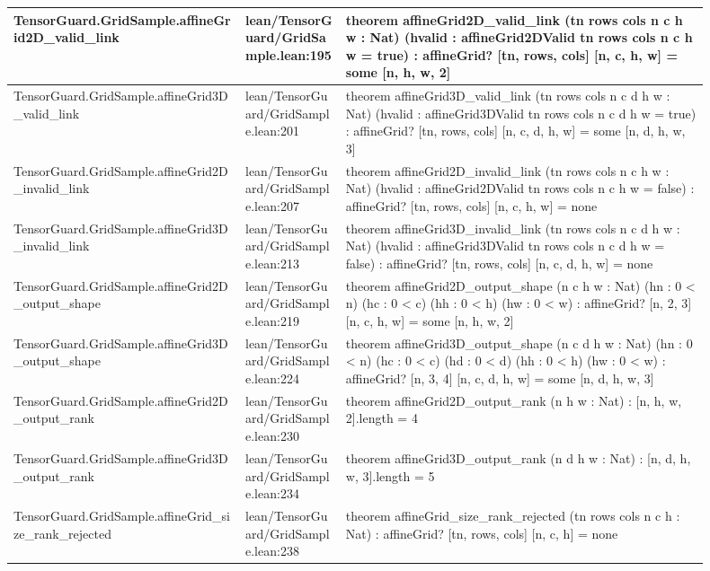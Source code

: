 \documentclass[10pt]{article}
\begin{document}
\begin{longtable}{|p{0.30\linewidth}|p{0.13\linewidth}|p{0.47\linewidth}|}
\hline
TensorGuard.GridSample.affineGrid2D\_valid\_link & lean/TensorGuard/GridSample.lean:195 & theorem affineGrid2D\_valid\_link (tn rows cols n c h w : Nat) (hvalid : affineGrid2DValid tn rows cols n c h w = true) : affineGrid? [tn, rows, cols] [n, c, h, w] = some [n, h, w, 2] \\
\hline
TensorGuard.GridSample.affineGrid3D\_valid\_link & lean/TensorGuard/GridSample.lean:201 & theorem affineGrid3D\_valid\_link (tn rows cols n c d h w : Nat) (hvalid : affineGrid3DValid tn rows cols n c d h w = true) : affineGrid? [tn, rows, cols] [n, c, d, h, w] = some [n, d, h, w, 3] \\
\hline
TensorGuard.GridSample.affineGrid2D\_invalid\_link & lean/TensorGuard/GridSample.lean:207 & theorem affineGrid2D\_invalid\_link (tn rows cols n c h w : Nat) (hvalid : affineGrid2DValid tn rows cols n c h w = false) : affineGrid? [tn, rows, cols] [n, c, h, w] = none \\
\hline
TensorGuard.GridSample.affineGrid3D\_invalid\_link & lean/TensorGuard/GridSample.lean:213 & theorem affineGrid3D\_invalid\_link (tn rows cols n c d h w : Nat) (hvalid : affineGrid3DValid tn rows cols n c d h w = false) : affineGrid? [tn, rows, cols] [n, c, d, h, w] = none \\
\hline
TensorGuard.GridSample.affineGrid2D\_output\_shape & lean/TensorGuard/GridSample.lean:219 & theorem affineGrid2D\_output\_shape (n c h w : Nat) (hn : 0 < n) (hc : 0 < c) (hh : 0 < h) (hw : 0 < w) : affineGrid? [n, 2, 3] [n, c, h, w] = some [n, h, w, 2] \\
\hline
TensorGuard.GridSample.affineGrid3D\_output\_shape & lean/TensorGuard/GridSample.lean:224 & theorem affineGrid3D\_output\_shape (n c d h w : Nat) (hn : 0 < n) (hc : 0 < c) (hd : 0 < d) (hh : 0 < h) (hw : 0 < w) : affineGrid? [n, 3, 4] [n, c, d, h, w] = some [n, d, h, w, 3] \\
\hline
TensorGuard.GridSample.affineGrid2D\_output\_rank & lean/TensorGuard/GridSample.lean:230 & theorem affineGrid2D\_output\_rank (n h w : Nat) : [n, h, w, 2].length = 4 \\
\hline
TensorGuard.GridSample.affineGrid3D\_output\_rank & lean/TensorGuard/GridSample.lean:234 & theorem affineGrid3D\_output\_rank (n d h w : Nat) : [n, d, h, w, 3].length = 5 \\
\hline
TensorGuard.GridSample.affineGrid\_size\_rank\_rejected & lean/TensorGuard/GridSample.lean:238 & theorem affineGrid\_size\_rank\_rejected (tn rows cols n c h : Nat) : affineGrid? [tn, rows, cols] [n, c, h] = none \\

\end{longtable}
\end{document}
